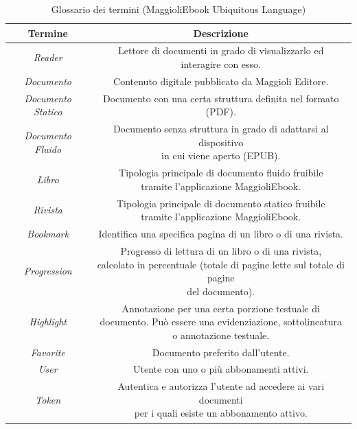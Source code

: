 \begin{table}[H]
\centering
    \begin{tabular}{|c|c|}
         \hline
         \textbf{Termine} & \textbf{Descrizione}\\
         \hline
         \textit{Reader} & \specialcell{Lettore di documenti in grado di visualizzarlo ed \\interagire con esso.}\\
         \hline
         \textit{Documento} & Contenuto digitale pubblicato da Maggioli Editore.\\
         \hline
         \textit{Documento Statico} & Documento con una certa struttura definita nel formato (PDF).\\
         \hline
         \textit{Documento Fluido} & \specialcell{Documento senza struttura in grado di adattarsi al dispositivo\\ in cui viene aperto (EPUB).}\\
         \hline
         \textit{Libro} & \specialcell{Tipologia principale di documento fluido fruibile\\ tramite l'applicazione MaggioliEbook.}\\
         \hline
         \textit{Rivista} & \specialcell{Tipologia principale di documento statico fruibile\\ tramite l'applicazione MaggioliEbook.}\\
         \hline
         \textit{Bookmark} & Identifica una specifica pagina di un libro o di una rivista.\\
         \hline
         \textit{Progression} & \specialcell{Progresso di lettura di un libro o di una rivista,\\ calcolato in percentuale (totale di pagine lette sul totale di pagine\\ del documento).}\\
         \hline
         \textit{Highlight} & \specialcell{Annotazione per una certa porzione testuale di \\documento. Può essere una evidenziazione, sottolineatura \\o annotazione testuale.}\\
         \hline
         \textit{Favorite} &  Documento preferito dall'utente.\\
         \hline
         \textit{User} & Utente con uno o più abbonamenti attivi.\\
         \hline
          \textit{Token} & \specialcell{Autentica e autorizza l'utente ad accedere ai vari documenti\\ per i quali esiste un abbonamento attivo.}\\
         \hline
    \end{tabular}
    \caption{Glossario dei termini (MaggioliEbook Ubiquitous Language)}
\end{table}

